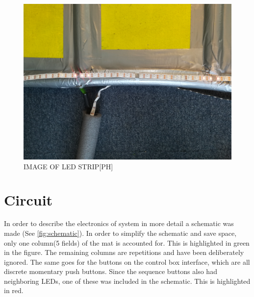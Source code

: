  	\begin{figure}[H]
 		\centering
 		\includegraphics[width=0.8\linewidth]{figure/Implementation/stripMat}
 		\caption{IMAGE OF LED STRIP[PH]}
 		\label{fig:stripMat}
 	\end{figure}
	
\section{Circuit}
In order to describe the electronics of system in more detail a schematic was made (See \autoref{fig:schematic}).
In order to simplify the schematic and save space, only one column(5 fields) of the mat is accounted for. This is highlighted in green in the figure. The remaining columns are repetitions and have been deliberately ignored. The same goes for the buttons on the control box interface, which are all discrete momentary push buttons. Since the sequence buttons also had neighboring LEDs, one of these was included in the schematic. This is highlighted in red.

